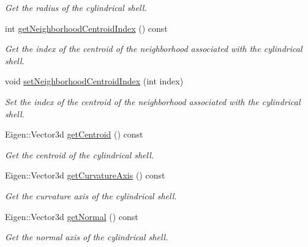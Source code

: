 \begin{DoxyCompactItemize}
\begin{DoxyCompactList}\small\item\em \-Get the radius of the cylindrical shell. \end{DoxyCompactList}\item 
\hypertarget{class_cylindrical_shell_a782ef84cc6043412d3e0d63f175c66bd}{int \hyperlink{class_cylindrical_shell_a782ef84cc6043412d3e0d63f175c66bd}{get\-Neighborhood\-Centroid\-Index} () const }\label{class_cylindrical_shell_a782ef84cc6043412d3e0d63f175c66bd}

\begin{DoxyCompactList}\small\item\em \-Get the index of the centroid of the neighborhood associated with the cylindrical shell. \end{DoxyCompactList}\item 
void \hyperlink{class_cylindrical_shell_a39b7b040c3a8442a0624d41f497d3613}{set\-Neighborhood\-Centroid\-Index} (int index)
\begin{DoxyCompactList}\small\item\em \-Set the index of the centroid of the neighborhood associated with the cylindrical shell. \end{DoxyCompactList}\item 
\hypertarget{class_cylindrical_shell_aa095b50d21504cae0b5afa44847f70b5}{\-Eigen\-::\-Vector3d \hyperlink{class_cylindrical_shell_aa095b50d21504cae0b5afa44847f70b5}{get\-Centroid} () const }\label{class_cylindrical_shell_aa095b50d21504cae0b5afa44847f70b5}

\begin{DoxyCompactList}\small\item\em \-Get the centroid of the cylindrical shell. \end{DoxyCompactList}\item 
\hypertarget{class_cylindrical_shell_a66a926117386cd8efefa593557d43cef}{\-Eigen\-::\-Vector3d \hyperlink{class_cylindrical_shell_a66a926117386cd8efefa593557d43cef}{get\-Curvature\-Axis} () const }\label{class_cylindrical_shell_a66a926117386cd8efefa593557d43cef}

\begin{DoxyCompactList}\small\item\em \-Get the curvature axis of the cylindrical shell. \end{DoxyCompactList}\item 
\hypertarget{class_cylindrical_shell_ab9be24ceb420724bff03824ea28d27fd}{\-Eigen\-::\-Vector3d \hyperlink{class_cylindrical_shell_ab9be24ceb420724bff03824ea28d27fd}{get\-Normal} () const }\label{class_cylindrical_shell_ab9be24ceb420724bff03824ea28d27fd}

\begin{DoxyCompactList}\small\item\em \-Get the normal axis of the cylindrical shell. \end{DoxyCompactList}\end{DoxyCompactItemize}


